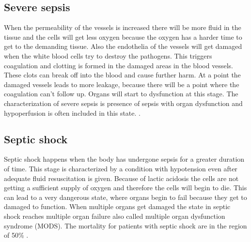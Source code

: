 \subsection{Severe sepsis}

When the permeability of the vessels is increased there will be more fluid in the tissue and the cells will get less oxygen because the oxygen has a harder time to get to the demanding tissue. Also the endothelia of the vessels will get damaged when the white blood cells try to destroy the pathogens. This triggers coagulation and clotting is formed in the damaged areas in the blood vessels. These clots can break off into the blood and cause further harm. At a point the damaged vessels leads to more leakage, because there will be a point where the coagulation can’t follow up. Organs will start to dysfunction at this stage. The characterization of severe sepsis is presence of sepsis with organ dysfunction and hypoperfusion is often included in this state. \cite{baudouin200,kanta2014}. 

\subsection{Septic shock}

Septic shock happens when the body has undergone sepsis for a greater duration of time. This stage is characterized by a condition with hypotension even after adequate fluid resuscitation is given. Because of lactic acidosis the cells are not getting a sufficient supply of oxygen and therefore the cells will begin to die. This can lead to a very dangerous state, where organs begin to fail because they get to damaged to function. When multiple organs get damaged the state in septic shock reaches multiple organ failure also called multiple organ dysfunction syndrome (MODS)\cite{baudouin200,kanta2014}. The mortality for patients with septic shock are in the region of 50\% \cite{baudouin200}. 

